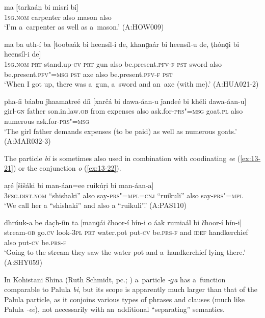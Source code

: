 \begin{exe}
\ex
\label{ex:13-18}
\gll ma [tarkaáṇ bi misrí bi]  \\
\textsc{1sg.nom} carpenter also mason also \\
\glt `I'm a~carpenter as well as a~mason.' (A:HOW009)

\ex
\label{ex:13-19}
\gll ma ba uth-í ba [toobaák bi heensíl-i de, khanɡaár bi heensíl-u de, ṭhónɡi bi heensíl-i de] \\
\textsc{1sg.nom} \textsc{prt} stand.up-\textsc{cv} \textsc{prt} gun also  be.present.\textsc{pfv-f} \textsc{pst} sword also be.present.\textsc{pfv"=msg } \textsc{pst} axe also be.present.\textsc{pfv-f } \textsc{pst} \\
\glt `When I got up, there was a~gun, a~sword and an~axe (with me).' (A:HUA021-2)

\ex
\label{ex:13-20}
\gll pha-íi báabu ǰhaamatreé díi [xarčá bi dawa-áan-u ǰandeé bi khéli dawa-áan-u]  \\
girl-\textsc{gn} father son.in.law.\textsc{ob} from expenses also  ask.for-\textsc{prs"=msg} goat.\textsc{pl} also numerous ask.for-\textsc{prs"=msg} \\
\glt `The girl father demands expenses (to be paid) as well as numerous goats.' (A:MAR032-3) 
\end{exe}

The particle \textit{bi} is sometimes also used in combination with coodinating \textit{ee} (\ref{ex:13-21}) or the conjunction \textit{o} (\ref{ex:13-22}).

\begin{exe}
\ex
\label{ex:13-21}
\gll aṛé  [šišáki  bi man-áan=ee  ruikúṛi bi man-áan-a] \\
\textsc{3fsg.dist.nom} ``shishaki'' also say-\textsc{prs"=mpl=cnj}  ``ruikuli'' also say-\textsc{prs"=mpl}\\
\glt `We call her a ``shishaki'' and also a ``ruikuli''.' (A:PAS110)

\ex
\label{ex:13-22}
\gll dhrúuk-a be dac̣h-íin ta [manɡái čhoor-í hín-i o áak rumiaál bi čhoor-í hín-i]  \\
stream-\textsc{ob} go.\textsc{cv} look-\textsc{3pl} \textsc{prt} water.pot put-\textsc{cv}  be.\textsc{prs-f} and \textsc{idef } handkerchief also put-\textsc{cv} be.\textsc{prs-f } \\
\glt `Going to the stream they saw the water pot and a~handkerchief lying there.' (A:SHY059) 
\end{exe}

In Kohistani Shina (Ruth Schmidt, pc.; \citealt[252]{schmidtkohistani2008}) a~particle \textit{-ɡa} has a~function comparable to Palula \textit{bi}, but its scope is apparently much larger than that of the Palula particle, as it conjoins various types of phrases and clauses (much like Palula \textit{-ee}), not necessarily with an~additional ``separating'' semantics. 



